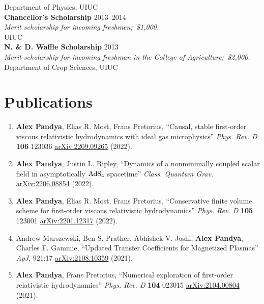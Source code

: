 \documentclass[margin,line,11pt]{resume}
\edef\hc{\string:} %
\edef\hs{\string;} %
\begin{document}
\begin{resume}
Department of Physics, UIUC\vspace{2mm}\\
\textbf{Chancellor's Scholarship} \hfill 2013--2014 \\
\textit{Merit scholarship for incoming freshmen\hs\, \$1,000.} \\
UIUC\vspace{2mm} \\
\textbf{N. \& D. Waffle Scholarship} \hfill 2013 \\
\textit{Merit scholarship for incoming freshman in the College of Agriculture\hs\, \$2,000.} \\
Department of Crop Sciences, UIUC


\section{\mysidestyle Publications}
\begin{enumerate}
\item \textbf{Alex Pandya}, Elias R. Most, Frans Pretorius, ``Causal, stable first-order viscous relativistic hydrodynamics with ideal gas microphysics'' \textit{Phys. Rev. D} \textbf{106} 123036 \href{https://arxiv.org/abs/2209.09265}{arXiv\hc2209.09265} (2022).
	
\item \textbf{Alex Pandya}, Justin L. Ripley, ``Dynamics of a nonminimally coupled scalar field in asymptotically $\textnormal{AdS}_{4}$ spacetime'' \textit{Class. Quantum Grav.} \href{https://arxiv.org/abs/2206.08854}{arXiv\hc2206.08854} (2022).
\vspace{1mm}

\item \textbf{Alex Pandya}, Elias R. Most, Frans Pretorius, ``Conservative finite volume scheme for first-order viscous relativistic hydrodynamics'' \textit{Phys. Rev. D} \textbf{105} 123001 \href{https://arxiv.org/abs/2201.12317}{arXiv\hc2201.12317} (2022).
\vspace{1mm}

\item Andrew Marszewski, Ben S. Prather, Abhishek V. Joshi, \textbf{Alex Pandya}, Charles F. Gammie, ``Updated Transfer Coefficients for Magnetized Plasmas'' \textit{ApJ}, 921\hc17 \href{https://arxiv.org/abs/2108.10359}{arXiv\hc2108.10359} (2021). \vspace{1mm}

\item \textbf{Alex Pandya}, Frans Pretorius, ``Numerical exploration of first-order relativistic hydrodynamics'' \textit{Phys. Rev. D} \textbf{104} 023015 \href{https://arxiv.org/abs/2104.00804}{arXiv\hc2104.00804} (2021).
\vspace{1mm}


\end{enumerate}
\end{resume}
\end{document}
